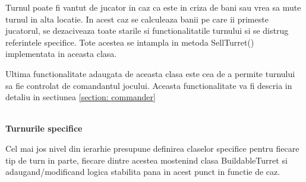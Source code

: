 \documentclass[12pt, a4paper]{article}
\begin{document}
	Turnul poate fi vantut de jucator in caz ca este in criza de bani sau vrea sa mute turnul in alta locatie. In acest caz se calculeaza banii pe care ii primeste jucatorul, se dezaciveaza toate starile si functionalitatile turnului si se distrug referintele specifice. Tote acestea se intampla in metoda SellTurret() implementata in aceasta clasa.
	
	Ultima functionalitate adaugata de aceasta clasa este cea de a permite turnului sa fie controlat de comandantul jocului. Aceasta functionalitate va fi descria in detaliu in sectiunea \ref{section: commander} 
	
	\ \\
	\textbf{Turnurile specifice}
	
	Cel mai jos nivel din ierarhie presupune definirea claselor specifice pentru fiecare tip de turn in parte, fiecare dintre acestea mostenind clasa BuildableTurret si adaugand/modificand logica stabilita pana in acest punct in functie de caz.
	
\end{document}
